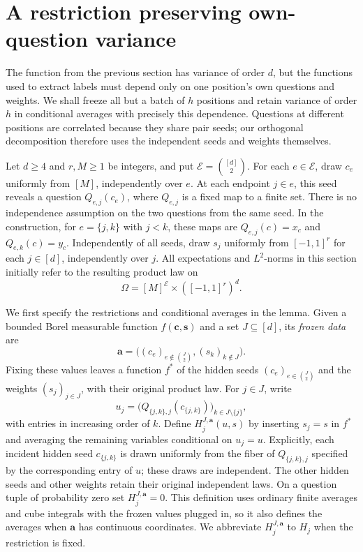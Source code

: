 \section{A restriction preserving own-question variance}
\label{sec:restriction}

The function from the previous section has variance of order \(d\),
but the functions used to extract labels must depend only on one
position's own questions and weights. We shall freeze all but a batch
of \(h\) positions and retain variance of order \(h\) in conditional
averages with precisely this dependence. Questions at different positions are
correlated because they share pair seeds; our orthogonal decomposition
therefore uses the independent seeds and weights themselves.

Let \(d\geq4\) and \(r,M\geq1\) be integers, and put
\(\mathcal E=\binom{[d]}2\).  For each \(e\in\mathcal E\), draw
\(c_e\) uniformly from \([M]\), independently over \(e\).  At each
endpoint \(j\in e\), this seed reveals a question
\(Q_{e,j}(c_e)\), where \(Q_{e,j}\) is a fixed map to a finite set.
There is no independence assumption on the two questions from the same seed.
In the construction, for \(e=\{j,k\}\) with \(j<k\), these maps are
\(Q_{e,j}(c)=x_c\) and \(Q_{e,k}(c)=y_c\).
Independently of all seeds, draw \(s_j\) uniformly from \([-1,1]^r\)
for each \(j\in[d]\), independently over \(j\).  All expectations and
\(L^2\)-norms in this section initially refer to the resulting product law
on
\[
 \Omega=[M]^{\mathcal E}\times([-1,1]^r)^d.
\]

We first specify the restrictions and conditional averages in the lemma.
Given a bounded Borel measurable function \(f(\mathbf c,\mathbf s)\) and a set
\(J\subseteq[d]\), its \emph{frozen data} are
\begin{equation}\label{res:frozen-data}
 \mathbf a=
 \bigl((c_e)_{e\notin\binom J2},(s_k)_{k\notin J}\bigr).
\end{equation}
Fixing these values leaves a function \(f^*\) of the hidden seeds
\((c_e)_{e\in\binom J2}\) and the weights \((s_j)_{j\in J}\), with
their original product law.  For \(j\in J\), write
\[
 u_j=\bigl(Q_{\{j,k\},j}(c_{\{j,k\}})\bigr)_{k\in J\setminus\{j\}},
\]
with entries in increasing order of \(k\).  Define
\(H_j^{J,\mathbf a}(u,s)\) by inserting \(s_j=s\) in \(f^*\) and
averaging the remaining variables conditional on \(u_j=u\).  Explicitly,
each incident hidden seed \(c_{\{j,k\}}\) is drawn uniformly from the
fiber of \(Q_{\{j,k\},j}\) specified by the corresponding entry of
\(u\); these draws are independent.  The other hidden seeds and other
weights retain their original independent laws.  On a question tuple
of probability zero set \(H_j^{J,\mathbf a}=0\).  This definition uses
ordinary finite averages and cube integrals with the frozen values plugged
in, so it also defines the averages when \(\mathbf a\) has continuous
coordinates.  We abbreviate \(H_j^{J,\mathbf a}\) to \(H_j\) when the
restriction is fixed.

